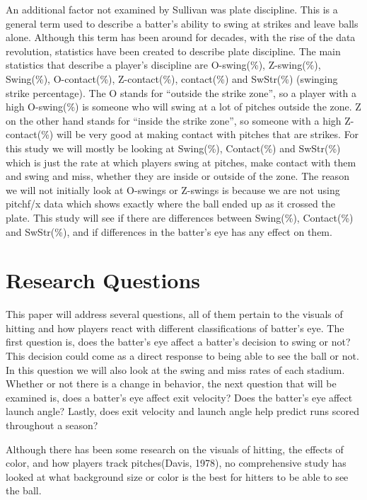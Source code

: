 \documentclass{article}
\begin{document}
\begin{doublespace}
An additional factor not examined by Sullivan was plate discipline. This is a general term used to describe a batter’s ability to swing at strikes and leave balls alone. Although this term has been around for decades, with the rise of the data revolution, statistics have been created to describe plate discipline. The main statistics that describe a player’s discipline are O-swing(\%), Z-swing(\%), Swing(\%), O-contact(\%), Z-contact(\%), contact(\%) and SwStr(\%) (swinging strike percentage). The O stands for “outside the strike zone”, so a player with a high O-swing(\%) is someone who will swing at a lot of pitches outside the zone. Z on the other hand stands for “inside the strike zone”, so someone with a high Z-contact(\%) will be very good at making contact with pitches that are strikes. For this study we will mostly be looking at Swing(\%), Contact(\%) and SwStr(\%) which is just the rate at which players swing at pitches, make contact with them and swing and miss, whether they are inside or outside of the zone. The reason we will not initially look at O-swings or Z-swings is because we are not using pitchf/x data which shows exactly where the ball ended up as it crossed the plate. This study will see if there are differences between Swing(\%), Contact(\%) and SwStr(\%), and if differences in the batter’s eye has any effect on them.    

\section{Research Questions}
This paper will address several questions, all of them pertain to the visuals of hitting and how players react with different classifications of batter’s eye. The first question is, does the batter’s eye affect a batter’s decision to swing or not? This decision could come as a direct response to being able to see the ball or not. In this question we will also look at the swing and miss rates of each stadium. Whether or not there is a change in behavior, the next question that will be examined is, does a batter’s eye affect exit velocity? Does the batter’s eye affect launch angle? Lastly, does exit velocity and launch angle help predict runs scored throughout a season? 

Although there has been some research on the visuals of hitting, the effects of color, and how players track pitches\citep{Kato}(Davis, 1978), no comprehensive study has looked at what background size or color is the best for hitters to be able to see the ball. 


\end{doublespace}
\end{document}
